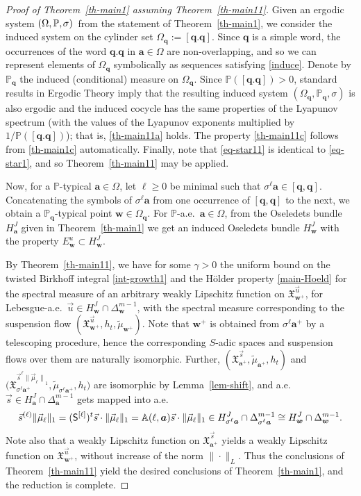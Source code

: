\documentclass[11pt]{article}
\numberwithin{equation}{section}\newcommand{\Relation}[2][]{}\newtheorem*{prop*}{Proposition}
\theoremstyle{plain}
\theoremstyle{definition}
\let\wt\widetilde
\newcommand\bom{{\boldsymbol a}}\let\ba\bom
\newcommand\bq{{\boldsymbol q}}
\newcommand\bw{{\boldsymbol w}}
\newcommand\bqcyl{[\bq.\bq]}
\let\gam\gamma
\let\Om\Omega
\let\sig\sigma
\newcommand\Xx{\mathfrak{X}}
\newcommand\Aa{\mathbb{A}}
\renewcommand{\P}{\mathbb{P}}
\newcommand\Sf{{\sf S}}
\begin{document}
\begin{proof}[Proof of Theorem~\ref{th-main1} assuming Theorem~\ref{th-main11}] Given an ergodic system $(\Om,\P,\mkern-1mu\sig)$~from the statement of Theorem~\ref{th-main1}, we consider the induced system on the cylinder set
$\Om_\bq:= [\bq.\bq]$.
Since $\bq$ is a simple word, the occurrences of the word $\bq.\bq$ in $\bom\in \Om$ are non-overlapping, and so
we can represent elements of $\Om_\bq$ symbolically as sequences satisfying \eqref{induce}. Denote by $\P_{\!\!\bq}$ the induced (conditional) measure on $\Om_\bq$. Since $\P([\bq.\bq])>0$, standard results in Ergodic Theory imply that the resulting induced system $(\Om_\bq,\P_{\!\!\bq},\sig)$ is also ergodic and the induced cocycle has the same properties of the Lyapunov spectrum (with the values of the Lyapunov exponents multiplied by $1/\P(\bqcyl)$); that is, \eqref{th-main11a} holds. The property \eqref{th-main11c} follows from \eqref{th-main1c} automatically. Finally, note that \eqref{eq-star11} is identical to \eqref{eq-star1}, and
so Theorem~\ref{th-main11} may be applied.

Now, for a $\P$-typical $\ba\in \Om$, let $\ell\ge 0$ be minimal such that $\sig^\ell\ba \in [\bq,\bq]$. Concatenating the symbols of $\sig^\ell\ba$ from one occurrence of $[\bq,\bq]$ to the next, we
obtain a $\P_{\!\!\bq}$-typical point $\bw\in \Om_\bq$.
For $\P$-a.e.\ $\ba\in \Om$, from the Oseledets bundle $H_\ba^J$ given in Theorem~\ref{th-main1} we get an induced Oseledets bundle $H_\bw^J$ with the property $E^u_\bw \subset H_\bw^J$.

By
Theorem~\ref{th-main11}, we have for some $\gam>0$ the uniform bound on the twisted Birkhoff integral \eqref{int-growth1} and the Hölder property \eqref{main-Hoeld}
for the spectral measure of an arbitrary
weakly Lipschitz function on $\Xx_{\bw^+}^{\vec u}$, for Lebesgue-a.e.\ $\vec u\in H_\bw^J\cap \Delta_\bw^{m-1}$, with the spectral measure corresponding to the suspension flow
$(\Xx_{\bw^+}^{\vec u}, h_t,\wt\mu_{\bw^+})$. Note that $\bw^+$ is obtained from $\sig^\ell\ba^+$ by a telescoping procedure, hence the corresponding $S$-adic spaces and suspension flows over them are naturally isomorphic. Further, $(\Xx_{\ba^+}^{\vec{s}},\wt{\mu}_{\bom^+},h_t)$ and $\bigl(\Xx_{\sig^\ell\ba^+}^{\vec{s}^{\ell}{\|\vec \mu_\ell\|}_1},\wt{\mu}_{\sig^\ell\bom^+},h_t\bigr)$ are isomorphic
by Lemma~\ref{lem-shift}, and a.e.\ $\vec s\in H^J_\ba\cap \Delta_\ba^{m-1}$ gets mapped into a.e.
\[
\vec s^{(\ell)}\|\vec\mu_\ell\|_1 = (\Sf^{[\ell]})^t \vec s \cdot\|\vec\mu_\ell\|_1 = \Aa(\ell,\ba)\vec s\cdot \|\vec\mu_\ell\|_1\in H_{\sig^\ell\ba}^J\cap \Delta^{m-1}_{\sig^\ell\ba}\cong H_\bw^J\cap \Delta_\bw^{m-1}.
\]
Note also that a weakly Lipschitz function on $\Xx_{\ba^+}^{\vec{s}}$ yields a weakly Lipschitz function on $\Xx_{\bw^+}^{\vec u}$, without increase of the norm $\|\cdot\|_L$. Thus the conclusions of Theorem~\ref{th-main11} yield the desired conclusions of Theorem~\ref{th-main1}, and the
reduction is complete.
\end{proof}
\end{document}
